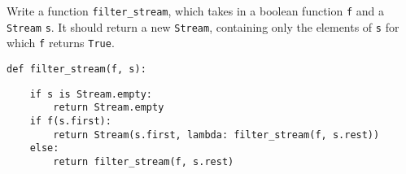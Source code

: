 \question Write a function \lstinline$filter_stream$, which takes in a
boolean function \lstinline$f$ and a \lstinline$Stream$ \lstinline$s$.
It should return a new \lstinline$Stream$, containing only the elements of
\lstinline$s$ for which \lstinline$f$ returns \lstinline$True$.

\begin{lstlisting}
def filter_stream(f, s):
\end{lstlisting}
\begin{solution}[3.5cm]
\begin{lstlisting}
    if s is Stream.empty:
        return Stream.empty
    if f(s.first):
        return Stream(s.first, lambda: filter_stream(f, s.rest))
    else:
        return filter_stream(f, s.rest)
\end{lstlisting}
\end{solution}
